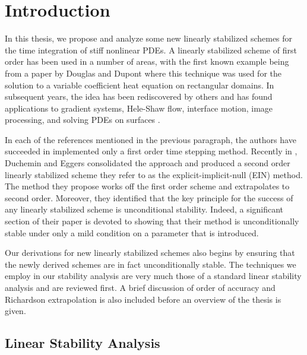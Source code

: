 \chapter{Introduction}
In this thesis, we propose and analyze some new linearly stabilized schemes for the time integration of stiff nonlinear PDEs. A linearly stabilized scheme of first order has been used in a number of areas, with the first known example being from a paper by Douglas and Dupont \cite{douglas1971alternating} where this technique was used for the solution to a variable coefficient heat equation on rectangular domains. In subsequent years, the idea has been rediscovered by others \cite{eyre1998unconditionally,smereka2003semi} and has found applications to gradient systems, Hele-Shaw flow, interface motion, image processing, and solving PDEs on surfaces \cite{eyre1998bunconditionally,salac2008local,glasner2002diffuse,schonlieb2011unconditionally,macdonald2009implicit}.

In each of the references mentioned in the previous paragraph, the authors have succeeded in implemented only a first order time stepping method. Recently in \cite{duchemin2014explicit},  Duchemin and Eggers consolidated the approach and produced a second order linearly stabilized scheme they refer to as the explicit-implicit-null (EIN) method. The method they propose works off the first order scheme and extrapolates to second order. Moreover, they identified that the key principle for the success of any linearly stabilized scheme is unconditional stability. Indeed, a significant section of their paper is devoted to showing that their method is unconditionally stable under only a mild condition on a parameter that is introduced.

Our derivations for new linearly stabilized schemes also begins by ensuring that the newly derived schemes are in fact unconditionally stable. The techniques we employ in our stability analysis are very much those of a standard linear stability analysis and are reviewed first. A brief discussion of order of accuracy and Richardson extrapolation is also included before an overview of the thesis is given.

\section{Linear Stability Analysis}
